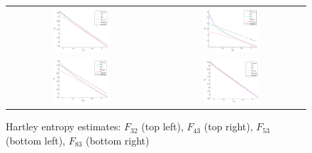 
\begin{figure}[H]
\centering
\begin{tabular}{cc}
\includegraphics[width=0.4\textwidth]{images5/frac32i.pdf} &
\includegraphics[width=0.4\textwidth]{images5/frac43i.pdf} \\
\includegraphics[width=0.4\textwidth]{images5/frac53i.pdf} &
\includegraphics[width=0.4\textwidth]{images5/frac83i.pdf}
\end{tabular}
\caption{Hartley entropy estimates: $F_{32}$ (top left), $F_{43}$ (top right), $F_{53}$ (bottom left), $F_{83}$ (bottom right) }
\label{fig:frac}
\end{figure}


